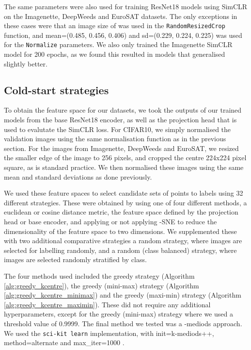 \documentclass{article}
\begin{document}
The same parameters were also used for training ResNet18 models using SimCLR on the Imagenette, DeepWeeds and EuroSAT datasets. The only exceptions in these cases were that an image size of  was used in the \texttt{RandomResizedCrop} function, and mean=(0.485, 0.456, 0.406) and sd=(0.229, 0.224, 0.225) was used for the \texttt{Normalize} parameters. We also only trained the Imagenette SimCLR model for 200 epochs, as we found this resulted in models that generalised slightly better.

\subsection{Cold-start strategies}
\label{sec:appendix_cold_start_strategies}

To obtain the feature space for our datasets, we took the outputs of our trained models from the base ResNet18 encoder, as well as the projection head that is used to evalutate the SimCLR loss. For CIFAR10, we simply normalised the validation images using the same normalisation function as in the previous section. For the images from Imagenette, DeepWeeds and EuroSAT, we resized the smaller edge of the image to 256 pixels, and cropped the centre 224x224 pixel square, as is standard practice. We then normalised these images using the same mean and standard deviations as done previously.

We used these feature spaces to select candidate sets of points to labels using 32 different strategies. These were obtained by using one of four different methods, a euclidean or cosine distance metric, the feature space defined by the projection head or base encoder, and applying or not applying -SNE to reduce the dimensionality of the feature space to two dimensions. We supplemented these with two additional comparative strategies \textemdash{} a random strategy, where images are selected for labelling randomly, and a random (class balanced) strategy, where images are selected randomly stratified by class. 

The four methods used included the greedy strategy (Algorithm \ref{alg:greedy_kcentre}), the greedy (mini-max) strategy (Algorithm \ref{alg:greedy_kcentre_minimax}) and the greedy (maxi-min) strategy (Algorithm \ref{alg:greedy_kcentre_maximin}). These did not require any additional hyperparameters, except for the greedy (mini-max) strategy where we used a threshold value of 0.9999. The final method we tested was a -mediods approach. We used the \texttt{sci-kit learn} implementation, with init=k-mediods++, method=alternate and max\_iter=1000 \citep{scikit-learn}.
\end{document}
